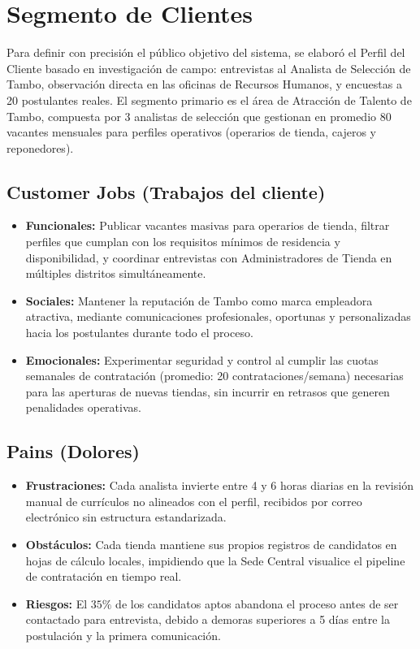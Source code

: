 \chapter{Segmento de Clientes}
Para definir con precisión el público objetivo del sistema, se elaboró el Perfil del Cliente basado 
en investigación de campo: entrevistas al Analista de Selección de Tambo, observación directa en las 
oficinas de Recursos Humanos, y encuestas a 20 postulantes reales. El segmento primario es el área de 
Atracción de Talento de Tambo, compuesta por 3 analistas de selección que gestionan en promedio 80 vacantes 
mensuales para perfiles operativos (operarios de tienda, cajeros y reponedores).

\section{ Customer Jobs (Trabajos del cliente)}
\begin{itemize}
  \item \textbf{Funcionales:} Publicar vacantes masivas para operarios de tienda, filtrar perfiles que cumplan con 
  los requisitos mínimos de residencia y disponibilidad, y coordinar entrevistas con Administradores de Tienda 
  en múltiples distritos simultáneamente.

  \item \textbf{Sociales:} Mantener la reputación de Tambo como marca empleadora atractiva, mediante comunicaciones profesionales, 
  oportunas y personalizadas hacia los postulantes durante todo el proceso.

  \item \textbf{Emocionales:} Experimentar seguridad y control al cumplir las cuotas semanales de contratación 
  (promedio: 20 contrataciones/semana) necesarias para las aperturas de nuevas tiendas, sin incurrir en retrasos 
  que generen penalidades operativas.
\end{itemize}

\section{Pains (Dolores)}
\begin{itemize}
  \item \textbf{Frustraciones:} Cada analista invierte entre 4 y 6 horas diarias en la revisión manual de currículos no 
  alineados con el perfil, recibidos por correo electrónico sin estructura estandarizada.
  \item \textbf{Obstáculos:} Cada tienda mantiene sus propios registros de candidatos en hojas de cálculo locales, 
  impidiendo que la Sede Central visualice el pipeline de contratación en tiempo real.
  \item \textbf{Riesgos:} El $35\%$ de los candidatos aptos abandona el proceso antes de ser contactado para entrevista, debido a demoras superiores a 5 días entre la postulación y la primera comunicación.
\end{itemize}

